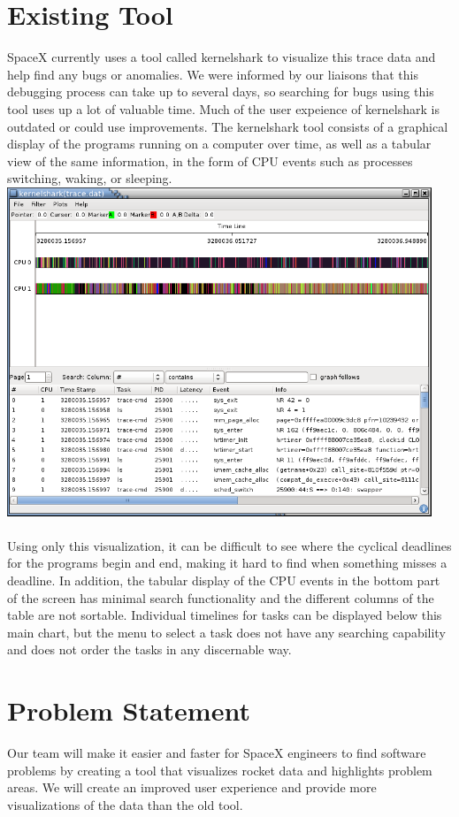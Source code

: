 \documentclass{hmcclinic}
\begin{document}
\section{Existing Tool}
SpaceX currently uses a tool called kernelshark to visualize this trace data and help find any bugs or anomalies. We were informed by our liaisons that this debugging process can take up to several days, so searching for bugs using this tool uses up a lot of valuable time. Much of the user expeience of kernelshark is outdated or could use improvements. The kernelshark tool consists of a graphical display of the programs running on a computer over time, as well as a tabular view of the same information, in the form of CPU events such as processes switching, waking, or sleeping.
\includegraphics[width=5in]{kshark-open.png}\\
\\
Using only this visualization, it can be difficult to see where the cyclical
deadlines for the programs begin and end, making it hard to find when something
misses a deadline. In addition, the tabular display of the CPU events in the
bottom part of the screen has minimal search functionality and the different
columns of the table are not sortable. Individual timelines for tasks can be
displayed below this main chart, but the menu to select a task does not have
any searching capability and does not order the tasks in any discernable way.

\section{Problem Statement} %
Our team will make it easier and faster for SpaceX engineers to find software problems by creating a tool that visualizes rocket data and highlights problem areas. We will create an improved user experience and provide more visualizations of the data than the old tool.
\end{document}
